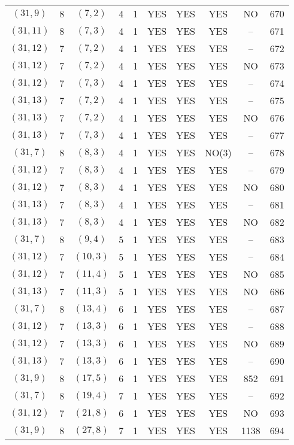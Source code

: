 \begin{longtable}{|c|c|c|c|c|c|c|c|c|c|}
$(31, 9)$ & 8 & $(7, 2)$ & 4 & 1 & YES & YES & YES & NO & 670\\
$(31, 11)$ & 8 & $(7, 3)$ & 4 & 1 & YES & YES & YES & -- & 671\\
$(31, 12)$ & 7 & $(7, 2)$ & 4 & 1 & YES & YES & YES & -- & 672\\
$(31, 12)$ & 7 & $(7, 2)$ & 4 & 1 & YES & YES & YES & NO & 673\\
$(31, 12)$ & 7 & $(7, 3)$ & 4 & 1 & YES & YES & YES & -- & 674\\
$(31, 13)$ & 7 & $(7, 2)$ & 4 & 1 & YES & YES & YES & -- & 675\\
$(31, 13)$ & 7 & $(7, 2)$ & 4 & 1 & YES & YES & YES & NO & 676\\
$(31, 13)$ & 7 & $(7, 3)$ & 4 & 1 & YES & YES & YES & -- & 677\\
$(31, 7)$ & 8 & $(8, 3)$ & 4 & 1 & YES & YES & NO(3) & -- & 678\\
$(31, 12)$ & 7 & $(8, 3)$ & 4 & 1 & YES & YES & YES & -- & 679\\
$(31, 12)$ & 7 & $(8, 3)$ & 4 & 1 & YES & YES & YES & NO & 680\\
$(31, 13)$ & 7 & $(8, 3)$ & 4 & 1 & YES & YES & YES & -- & 681\\
$(31, 13)$ & 7 & $(8, 3)$ & 4 & 1 & YES & YES & YES & NO & 682\\
$(31, 7)$ & 8 & $(9, 4)$ & 5 & 1 & YES & YES & YES & -- & 683\\
$(31, 12)$ & 7 & $(10, 3)$ & 5 & 1 & YES & YES & YES & -- & 684\\
$(31, 12)$ & 7 & $(11, 4)$ & 5 & 1 & YES & YES & YES & NO & 685\\
$(31, 13)$ & 7 & $(11, 3)$ & 5 & 1 & YES & YES & YES & NO & 686\\
$(31, 7)$ & 8 & $(13, 4)$ & 6 & 1 & YES & YES & YES & -- & 687\\
$(31, 12)$ & 7 & $(13, 3)$ & 6 & 1 & YES & YES & YES & -- & 688\\
$(31, 12)$ & 7 & $(13, 3)$ & 6 & 1 & YES & YES & YES & NO & 689\\
$(31, 13)$ & 7 & $(13, 3)$ & 6 & 1 & YES & YES & YES & -- & 690\\
$(31, 9)$ & 8 & $(17, 5)$ & 6 & 1 & YES & YES & YES & 852 & 691\\
$(31, 7)$ & 8 & $(19, 4)$ & 7 & 1 & YES & YES & YES & -- & 692\\
$(31, 12)$ & 7 & $(21, 8)$ & 6 & 1 & YES & YES & YES & NO & 693\\
$(31, 9)$ & 8 & $(27, 8)$ & 7 & 1 & YES & YES & YES & 1138 & 694\\

\end{longtable}

